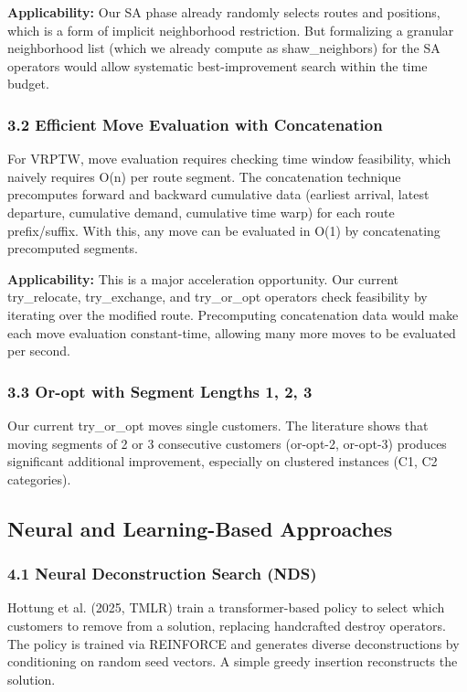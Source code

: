 \documentclass[twocolumn,10pt,letterpaper]{article}
\begin{document}
\textbf{Applicability:} Our SA phase already randomly selects routes and positions, which is a form of implicit neighborhood restriction. But formalizing a granular neighborhood list (which we already compute as shaw\_neighbors) for the SA operators would allow systematic best-improvement search within the time budget.


\subsubsection{3.2 Efficient Move Evaluation with Concatenation}

For VRPTW, move evaluation requires checking time window feasibility, which naively requires O(n) per route segment. The concatenation technique precomputes forward and backward cumulative data (earliest arrival, latest departure, cumulative demand, cumulative time warp) for each route prefix/suffix. With this, any move can be evaluated in O(1) by concatenating precomputed segments.


\textbf{Applicability:} This is a major acceleration opportunity. Our current try\_relocate, try\_exchange, and try\_or\_opt operators check feasibility by iterating over the modified route. Precomputing concatenation data would make each move evaluation constant-time, allowing many more moves to be evaluated per second.


\subsubsection{3.3 Or-opt with Segment Lengths 1, 2, 3}

Our current try\_or\_opt moves single customers. The literature shows that moving segments of 2 or 3 consecutive customers (or-opt-2, or-opt-3) produces significant additional improvement, especially on clustered instances (C1, C2 categories).


\subsection{Neural and Learning-Based Approaches}

\subsubsection{4.1 Neural Deconstruction Search (NDS)}

Hottung et al. (2025, TMLR) train a transformer-based policy to select which customers to remove from a solution, replacing handcrafted destroy operators. The policy is trained via REINFORCE and generates diverse deconstructions by conditioning on random seed vectors. A simple greedy insertion reconstructs the solution.
\end{document}

